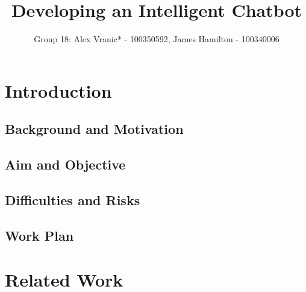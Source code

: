 \documentclass[11pt]{article}
\title{Developing an Intelligent Chatbot}
\author{Group 18: Alex Vranic* - 100350592, James Hamilton - 100340006}
\begin{document}
\maketitle

\begin{abstract}

\end{abstract}

\section{Introduction}
% 

\subsection{Background and Motivation}

\subsection{Aim and Objective} 

\subsection{Difficulties and Risks}


\subsection{Work Plan}


\section{Related Work}
\end{document}
